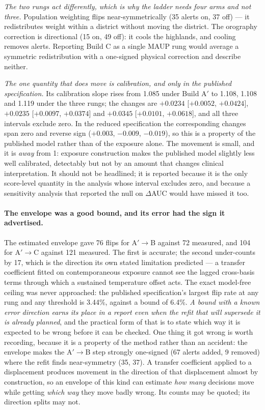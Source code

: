 \emph{The two rungs act differently, which is why the ladder needs four arms and not three.} Population weighting flips near-symmetrically (35 alerts on, 37 off) --- it redistributes weight within a district without moving the district. The orography correction is directional (15 on, 49 off): it cools the highlands, and cooling removes alerts. Reporting Build C as a single MAUP rung would average a symmetric redistribution with a one-signed physical correction and describe neither.

\emph{The one quantity that does move is calibration, and only in the published specification.} Its calibration slope rises from 1.085 under Build A$'$ to 1.108, 1.108 and 1.119 under the three rungs; the changes are $+0.0234$ [$+0.0052$, $+0.0424$], $+0.0235$ [$+0.0097$, $+0.0374$] and $+0.0345$ [$+0.0101$, $+0.0618$], and all three intervals exclude zero. In the reduced specification the corresponding changes span zero and reverse sign ($+0.003$, $-0.009$, $-0.019$), so this is a property of the published model rather than of the exposure alone. The movement is small, and it is \emph{away} from 1: exposure construction makes the published model slightly less well calibrated, detectably but not by an amount that changes clinical interpretation. It should not be headlined; it is reported because it is the only score-level quantity in the analysis whose interval excludes zero, and because a sensitivity analysis that reported the null on $\Delta$AUC would have missed it too.

\paragraph{The envelope was a good bound, and its error had the sign it advertised.} The estimated envelope gave 76 flips for A$'\to$B against 72 measured, and 104 for A$'\to$C against 121 measured. The first is accurate; the second under-counts by 17, which is the direction its own stated limitation predicted --- a transfer coefficient fitted on contemporaneous exposure cannot see the lagged cross-basis terms through which a sustained temperature offset acts. The exact model-free ceiling was never approached: the published specification's largest flip rate at any rung and any threshold is 3.44\%, against a bound of 6.4\%. \emph{A bound with a known error direction earns its place in a report even when the refit that will supersede it is already planned}, and the practical form of that is to state which way it is expected to be wrong before it can be checked. One thing it got wrong is worth recording, because it is a property of the method rather than an accident: the envelope makes the A$'\to$B step strongly one-signed (67 alerts added, 9 removed) where the refit finds near-symmetry (35, 37). A transfer coefficient applied to a displacement produces movement in the direction of that displacement almost by construction, so an envelope of this kind can estimate \emph{how many} decisions move while getting \emph{which way} they move badly wrong. Its counts may be quoted; its direction splits may not.

